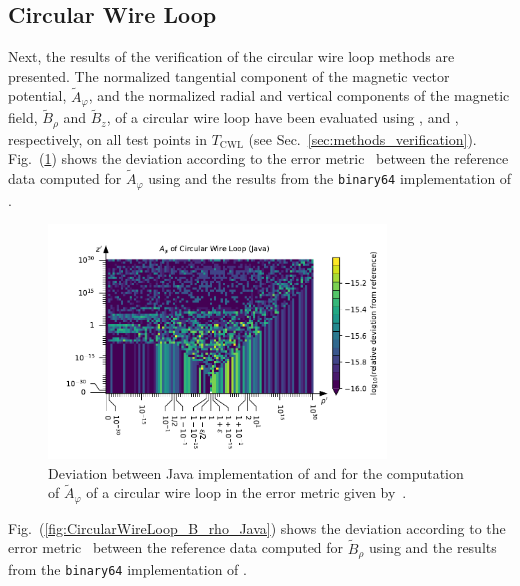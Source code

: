 \subsection{Circular Wire Loop}
Next, the results of the verification of the circular wire loop methods are presented.
The normalized tangential component of the magnetic vector potential, $\tilde{A}_\varphi$,
and the normalized radial and vertical components of the magnetic field, $\tilde{B}_\rho$ and $\tilde{B}_z$,
of a circular wire loop have been evaluated using , 
and , respectively,
on all test points in $T_\mathrm{CWL}$ (see Sec.~\ref{sec:methods_verification}).
Fig.~(\ref{fig:CircularWireLoop_A_phi_Java}) shows the deviation
according to the error metric~
between the reference data computed for $\tilde{A}_\varphi$ using 
and the results from the \texttt{binary64} implementation of .
\begin{figure}[htbp]
 \centering
 \includegraphics[width=0.8\textwidth]{img/CircularWireLoop_A_phi_Java.pdf}
 \caption{Deviation between Java implementation of  and 
          for the computation of $\tilde{A}_\varphi$ of a circular wire loop
          in the error metric given by~.}
 \label{fig:CircularWireLoop_A_phi_Java}
\end{figure}
Fig.~(\ref{fig:CircularWireLoop_B_rho_Java}) shows the deviation
according to the error metric~
between the reference data computed for $\tilde{B}_\rho$ using 
and the results from the \texttt{binary64} implementation of .
